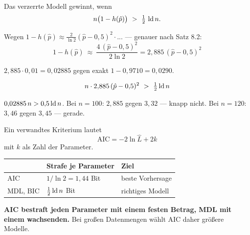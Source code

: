\begin{merksatz}
Das verzerrte Modell gewinnt, wenn
\[ n\bigl(1-h(\hat p)\bigr) \ >\ \tfrac12\,\operatorname{ld} n . \]

Wegen $1-h(\hat p) \approx \frac{2}{\ln 2}(\hat p - 0{,}5)^2 \cdot ...$ --- genauer nach Satz 8.2:
\[ 1-h(\hat p) \ \approx\ \frac{4\,(\hat p-0{,}5)^2}{2\ln 2} = 2{,}885\,(\hat p-0{,}5)^2 \]

 $2{,}885\cdot0{,}01 = 0{,}02885$ gegen exakt $1-0{,}9710 = 0{,}0290$. \checkmark

\[ n\cdot2{,}885\,(\hat p-0{,}5)^2 \ >\ \tfrac12\lb n \]

 $0{,}02885\,n > 0{,}5\operatorname{ld} n$. Bei $n=100$: $2{,}885$ gegen $3{,}32$ --- knapp nicht. Bei $n=120$: $3{,}46$ gegen $3{,}45$ --- gerade. \checkmark
\end{merksatz}

\begin{merksatz}
Ein verwandtes Kriterium lautet
\[ \text{AIC} = -2\ln\hat L + 2k \]
mit $k$ als Zahl der Parameter.

\begin{center}
{\small
\renewcommand{\arraystretch}{1.5}
\begin{tabular}{@{}P{2.2cm}P{2.8cm}P{2.8cm}@{}}
\toprule
& \textbf{Strafe je Parameter} & \textbf{Ziel}\\
\midrule
AIC & $1/\ln 2 = 1{,}44$ Bit & beste Vorhersage\\
MDL, BIC & $\tfrac12\operatorname{ld} n$ Bit & richtiges Modell\\
\bottomrule
\end{tabular}}
\end{center}

\begin{center}
\begin{minipage}{0.9\textwidth}
\textbf{AIC bestraft jeden Parameter mit einem festen Betrag, MDL mit einem wachsenden.} Bei großen Datenmengen wählt AIC daher größere Modelle.
\end{minipage}
\end{center}

\begin{center}
\begin{minipage}{0.88\textwidth}
\end{minipage}
\end{center}
\end{merksatz}


